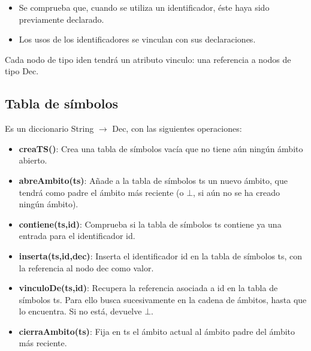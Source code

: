 \documentclass[11pt]{article}
\begin{document}
        \begin{itemize}
            \item Se comprueba que, cuando se utiliza un identificador, éste haya sido previamente declarado.
            \item Los usos de los identificadores se vinculan con sus declaraciones.
        \end{itemize}
        Cada nodo de tipo iden tendrá un atributo vinculo: una referencia a nodos de
        tipo Dec.

        \subsection{Tabla de símbolos}
            Es un diccionario String $\rightarrow$ Dec, con las siguientes operaciones:
            \begin{itemize}
                \item \textbf{creaTS()}: Crea una tabla de símbolos vacía que no tiene aún ningún ámbito abierto.
                \item \textbf{abreAmbito(ts)}: Añade a la tabla de símbolos ts un nuevo ámbito, que tendrá como padre el ámbito más reciente (o $\bot$, si aún no se ha creado ningún ámbito).
                \item \textbf{contiene(ts,id)}: Comprueba si la tabla de símbolos ts contiene ya una entrada para el identificador id.
                \item \textbf{inserta(ts,id,dec)}: Inserta el identificador id en la tabla de símbolos ts, con la referencia al nodo dec como valor.
                \item \textbf{vinculoDe(ts,id)}: Recupera la referencia asociada a id en la tabla de símbolos ts. Para ello busca sucesivamente en la cadena de ámbitos, hasta que lo encuentra. Si no está, devuelve $\bot$.
                \item \textbf{cierraAmbito(ts)}: Fija en ts el ámbito actual al ámbito padre del ámbito más reciente.
            \end{itemize}
\end{document}

